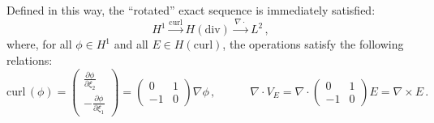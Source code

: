 Defined in this way, the ``rotated'' exact sequence is immediately satisfied:
\begin{equation}
H^1 \xrightarrow{\mathrm{curl}} H(\mathrm{div}) \xrightarrow{\,\nabla\cdot\,} L^2 \,,
\label{eq:2DExactSeqRotated}
\end{equation}
where, for all $\phi\in H^1$ and all $E\in H(\mathrm{curl})$, the operations satisfy the following relations: %
\begin{equation}
    \mathrm{curl}\,(\phi)=\begin{pmatrix}\frac{\partial\phi}{\partial \xi_2}\\[4pt]-\frac{\partial\phi}{\partial \xi_1}\end{pmatrix}
        =\begin{pmatrix}0&1\\[4pt]-1&0\end{pmatrix}\nabla\phi\,,\qquad\quad
            \nabla\cdot V_E=\nabla\cdot\begin{pmatrix}0&1\\[4pt]-1&0\end{pmatrix}E=\nabla\times E\,.
\end{equation}


